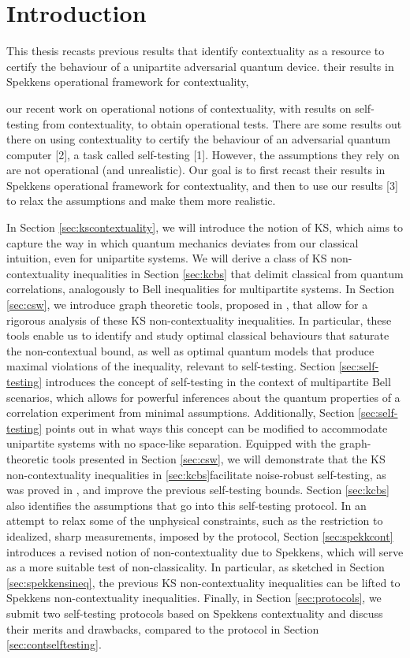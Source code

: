 \chapter{Introduction}
This thesis recasts previous results that identify contextuality as a resource to certify the behaviour of a unipartite adversarial quantum device. their results in Spekkens operational framework for contextuality,


our recent work on operational notions of contextuality, with results on self-testing from contextuality, to obtain operational tests.
There are some results out there on using contextuality to certify the behaviour of an adversarial quantum computer [2], a task called self-testing [1]. However, the assumptions they rely on are not operational (and unrealistic). Our goal is to first recast their results in Spekkens operational framework for contextuality, and then to use our results [3] to relax the assumptions and make them more realistic.

In Section \ref{sec:kscontextuality}, we will introduce the notion of KS, which aims to capture the way in which quantum mechanics deviates from our classical intuition, even for unipartite systems. We will derive a class of KS non-contextuality inequalities in Section \ref{sec:kcbs} that delimit classical from quantum correlations, analogously to Bell inequalities for multipartite systems. In Section \ref{sec:csw}, we introduce graph theoretic tools, proposed in \cite{Cabello2014}, that allow for a rigorous analysis of these KS non-contextuality inequalities. In particular, these tools enable us to identify and study optimal classical behaviours that saturate the non-contextual bound, as well as optimal quantum models that produce maximal violations of the inequality, relevant to self-testing. Section \ref{sec:self-testing} introduces the concept of self-testing in the context of multipartite Bell scenarios, which allows for powerful inferences about the quantum properties of a correlation experiment from minimal assumptions. Additionally, Section \ref{sec:self-testing} points out in what ways this concept can be modified to accommodate unipartite systems with no space-like separation. Equipped with the graph-theoretic tools presented in Section \ref{sec:csw}, we will demonstrate that the KS non-contextuality inequalities in \ref{sec:kcbs}facilitate noise-robust self-testing, as was proved in \cite{Bharti2019}, and improve the previous self-testing bounds. Section \ref{sec:kcbs} also identifies the assumptions that go into this self-testing protocol. In an attempt to relax some of the unphysical constraints, such as the restriction to idealized, sharp measurements, imposed by the protocol, Section \ref{sec:spekkcont} introduces a revised notion of non-contextuality due to Spekkens, which will serve as a more suitable test of non-classicality. In particular, as sketched in Section \ref{sec:spekkensineq}, the previous KS non-contextuality inequalities can be lifted to Spekkens non-contextuality inequalities. Finally, in Section \ref{sec:protocols}, we submit two self-testing protocols based on Spekkens contextuality and discuss their merits and drawbacks, compared to the protocol in Section \ref{sec:contselftesting}.
